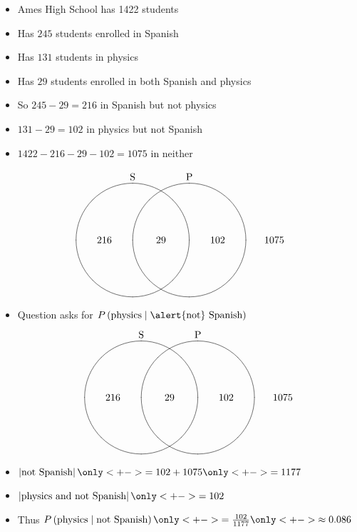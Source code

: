\documentclass{beamer}
\theoremstyle{definition}
\begin{document}
\begin{frame}
\begin{itemize}
\item Ames High School has 1422 students
\item Has $245$ students enrolled in Spanish
\item Has $131$ students in physics
\item Has $29$ students enrolled in both Spanish and physics
\item So $245-29=216$ in Spanish but not physics
\item $131-29=102$ in physics but not Spanish
\item $1422-216-29-102=1075$ in neither
\end{itemize}
\[\begin{xy}<1cm,0cm>:
(-1,2)*+!D{\text{S}};
(1,2)*+!D{\text{P}};
(-1,0)*\cir<2cm>{};
(1,0)*\cir<2cm>{};
(0,0)*{29};
(-2,0)*{216};
(2,0)*{102};
(4,0)*{1075};
\end{xy}\]
\end{frame}

\begin{frame}
\begin{itemize}
\item Question asks for $P\left(\text{physics}\mid
\text{\alert{not} Spanish}\right)$
\[\begin{xy}<1cm,0cm>:
(-1,2)*+!D{\text{S}};
(1,2)*+!D{\text{P}};
(-1,0)*\cir<2cm>{};
(1,0)*\cir<2cm>{};
(0,0)*{29};
(-2,0)*{216};
(2,0)*{102};
(4,0)*{1075};
\end{xy}\]
\item $\left|\text{not Spanish}\right|
\only<+->{=102+1075}\only<+->{=1177}$
\item $\left|\text{physics and not Spanish}\right|
\only<+->{=102}$
\item Thus
$P\left(\text{physics}\mid
\text{not Spanish}\right)\only<+->{=\frac{102}{1177}}
\only<+->{\approx 0.086}$
\end{itemize}
\end{frame}
\end{document}
